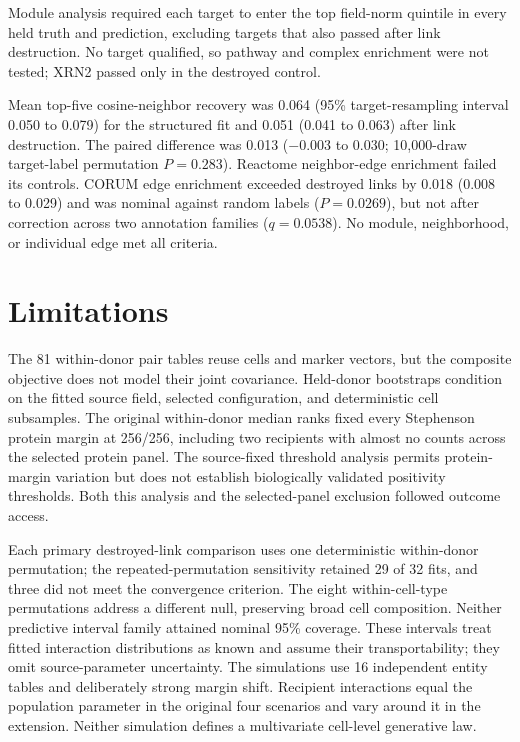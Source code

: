 \documentclass[10pt,a4paper]{article}
\begin{document}
Module analysis required each target to enter the top field-norm quintile in every held truth and prediction, excluding targets that also passed after link destruction. No target qualified, so pathway and complex enrichment were not tested; XRN2 passed only in the destroyed control.

Mean top-five cosine-neighbor recovery was 0.064 (95\% target-resampling interval 0.050 to 0.079) for the structured fit and 0.051 (0.041 to 0.063) after link destruction. The paired difference was 0.013 ($-0.003$ to $0.030$; 10,000-draw target-label permutation $P=0.283$). Reactome neighbor-edge enrichment failed its controls. CORUM edge enrichment exceeded destroyed links by 0.018 (0.008 to 0.029) and was nominal against random labels ($P=0.0269$), but not after correction across two annotation families ($q=0.0538$). No module, neighborhood, or individual edge met all criteria.

\FloatBarrier
\section{Limitations}

The 81 within-donor pair tables reuse cells and marker vectors, but the composite objective does not model their joint covariance. Held-donor bootstraps condition on the fitted source field, selected configuration, and deterministic cell subsamples. The original within-donor median ranks fixed every Stephenson protein margin at 256/256, including two recipients with almost no counts across the selected protein panel. The source-fixed threshold analysis permits protein-margin variation but does not establish biologically validated positivity thresholds. Both this analysis and the selected-panel exclusion followed outcome access.

Each primary destroyed-link comparison uses one deterministic within-donor permutation; the repeated-permutation sensitivity retained 29 of 32 fits, and three did not meet the convergence criterion. The eight within-cell-type permutations address a different null, preserving broad cell composition. Neither predictive interval family attained nominal 95\% coverage. These intervals treat fitted interaction distributions as known and assume their transportability; they omit source-parameter uncertainty. The simulations use 16 independent entity tables and deliberately strong margin shift. Recipient interactions equal the population parameter in the original four scenarios and vary around it in the extension. Neither simulation defines a multivariate cell-level generative law.
\end{document}

